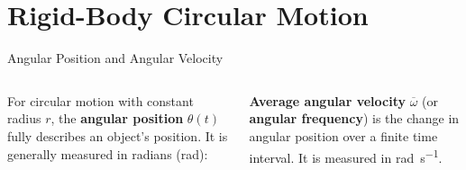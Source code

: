 \documentclass[12pt,compress,aspectratio=169]{beamer}
\newcommand{\eq}[2]{\vspace{#1}{\Large\begin{displaymath}#2\end{displaymath}}}
\begin{document}
%      
%
%      



\section{Rigid-Body Circular Motion}

\begin{frame}{Angular Position and Angular Velocity}
  \vspace{.2in}
  \begin{columns}
    
    For circular motion with constant radius $r$, the \textbf{angular position}
    $\theta(t)$ fully describes an object's position. It is generally measured
    in radians (rad):
      
    \eq{-.25in}{
      \boxed{\theta=\theta(t)}
    }
    
    \textbf{Average angular velocity} $\overline{\omega}$ (or
    \textbf{angular frequency}) is the change in angular position over a finite
    time interval. It is measured in \si{rad\per\second}.
    
    \eq{-.2in}{
      \boxed{\overline{\omega}=\frac{\Delta\theta}{\Delta t}}
    }

  \end{columns}
\end{frame}
\end{document}
